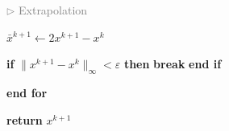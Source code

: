 \documentclass{article}
\newcommand{\kw}[1]{\textbf{#1}}          %
\newcommand{\cmt}[1]{\textcolor{gray}{\(\triangleright\) #1}}  %
\begin{document}
\begin{mdframed}[
  linewidth=0.8pt,
  innertopmargin=8pt,
  innerbottommargin=8pt,
  innerrightmargin=10pt,
  innerleftmargin=10pt,
]
\begin{algolist}
\begin{algoinner}
    \medskip
    \item \cmt{Extrapolation}
    \item $\bar x^{k+1} \leftarrow 2x^{k+1} - x^k$

    \medskip
    \item \kw{if} $\|x^{k+1} - x^k\|_\infty < \varepsilon$\;
          \kw{then} \textbf{break} \kw{end if}
  \end{algoinner}

  \item \kw{end for}

  \item \textbf{return} $x^{k+1}$
\end{algolist}
\end{mdframed}
\end{document}
